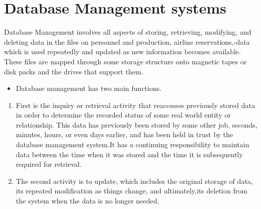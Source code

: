 \documentclass[a4paper]{article}
\begin{document}
\section{Database Management systems}
Database Management involves all aspects of storing, retrieving, modifying, and deleting data in the files on personnel and production, airline reservations,-data which is used repeatedly and updated as new information becomes available. These files are mapped through some storage structure onto magnetic tapes or disk packs and the drives that support them.
\begin{itemize}
\item Database management has two main functions.
\end{itemize}
\begin{enumerate}
\item First is the inquiry or retrieval activity that reaccesses previously stored data in order to determine the recorded status of some real world entity or relationship. This data has previously been stored by some other job,
seconds, minutes, hours, or even days earlier, and has
been held in trust by the database management system.It has a continuing responsibility to maintain data between the time when it was stored and the time it is subsequently required for retrieval.
\item The second activity is to update, which includes the original storage of data, its repeated modification as things change, and ultimately,its deletion from the system when the data is no longer needed.
\end{enumerate}
\end{document}
